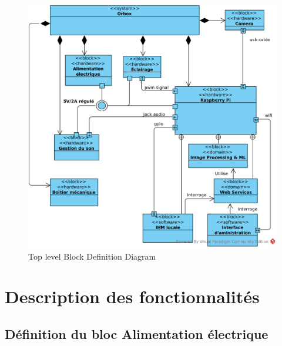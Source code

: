\begin{figure}[H]
	\centerline{
		\includegraphics[scale=0.75]{img/SysML_Top_BDD.png}
	}
	\caption{Top level Block Definition Diagram}
	\label{TopBDD}
\end{figure}
    
    \section{Description des fonctionnalités}
\label{sec:fonctions}

    \subsection{Définition du bloc Alimentation électrique}
\label{sub:DefAlim}

